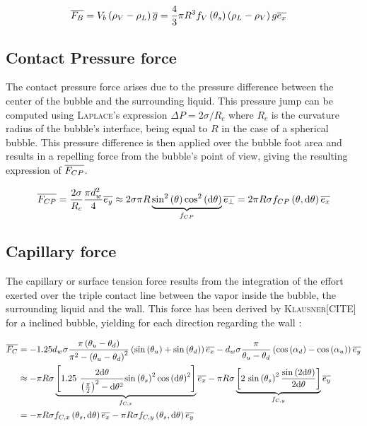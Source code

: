 \begin{align}
\overline{F_{B}}&=V_{b}\left( \rho_{V}-\rho_{L} \right)\overline{g}=\frac{4}{3}\pi R^{3}f_{V}\left( \theta_{s} \right)\left( \rho_{L}-\rho_{V} \right)g\overline{e_{x}}
\end{align}

\subsection{Contact Pressure force}

The contact pressure force arises due to the pressure difference between the center of the bubble and the surrounding liquid. This pressure jump can be computed using \textsc{Laplace}'s expression $\Delta P = 2\sigma / R_{c}$ where $R_{c}$ is the curvature radius of the bubble's interface, being equal to $R$ in the case of a spherical bubble. This pressure difference is then applied over the bubble foot area and results in a repelling force from the bubble's point of view, giving the resulting expression of $\overline{F_{CP}}$.

\begin{align}
\overline{F_{CP}}&=\frac{2\sigma}{R_{c}}\frac{\pi d_{w}^{2}}{4}\overline{e_{y}} \approx 2\sigma \pi R \underbrace{\mathrm{sin}^{2}\left( \theta \right) \mathrm{cos}^{2}\left( \mathrm{d}\theta \right)}_{f_{CP}}\overline{e_{\bot}} =2\pi R \sigma f_{CP}\left( \theta, \mathrm{d}\theta \right)\overline{e_{x}}\\
\end{align}

\subsection{Capillary force}

The capillary or surface tension force results from the integration of the effort exerted over the triple contact line between the vapor inside the bubble, the surrounding liquid and the wall. This force has been derived by \textsc{Klausner}[CITE] for a inclined bubble, yielding for each direction regarding the wall :

\begin{align}
\vect{F_{C}}&=-1.25 d_{w}\sigma \frac{\pi\parth{\theta_{u}-\theta_{d}}}{\pi^{2}-\parth{\theta_{u}-\theta_{d}}^{2}}\parth{\sin{\theta_{u}}+\sin{\theta_{d}} }\vect{e_{x}} -d_{w} \sigma \frac{\pi}{\theta_{u}-\theta_{d}}\parth{\cos{\alpha_{d}}- \cos{\alpha_{u}}}\vect{e_{y}} \\
%
&\approx -\pi R \sigma \underbrace{\crocht{1.25\ \frac{2\dtheta}{\parth{\frac{\pi}{2}}^{2}-\dtheta^{2}}\sin{\theta_{s}}^{2}\cos{\dtheta}^{2}}}_{f_{C,x}} \vect{e_{x}} - \pi R \sigma \underbrace{\crocht{2\ \sin{\theta_{s}}^{2}\frac{\sin{2\dtheta}}{2\dtheta}}}_{f_{C,y}}\vect{e_{y}}\\
%
&= -\pi R \sigma f_{C,x}\parth{\theta_{s}, \dtheta}\vect{e_{x}} - \pi R \sigma f_{C,y}\parth{\theta_{s}, \dtheta} \vect{e_{y}}
\end{align}

